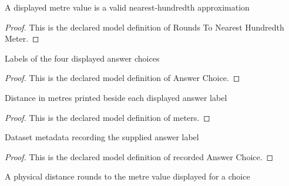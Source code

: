 \begin{definition}
  \label{def:physics:phyx-mini-0780:phyxminiproblems-problemphyxmini0780-roundstonearesthundredthmeter}
  A displayed metre value is a valid nearest-hundredth approximation
\end{definition}
\begin{proof}
  This is the declared model definition of Rounds To Nearest Hundredth Meter.
\end{proof}
\begin{definition}
  \label{def:physics:phyx-mini-0780:phyxminiproblems-problemphyxmini0780-answerchoice}
  Labels of the four displayed answer choices
\end{definition}
\begin{proof}
  This is the declared model definition of Answer Choice.
\end{proof}
\begin{definition}[meters]
  \label{def:physics:phyx-mini-0780:phyxminiproblems-problemphyxmini0780-answerchoice-meters}
  Distance in metres printed beside each displayed answer label
\end{definition}
\begin{proof}
  This is the declared model definition of meters.
\end{proof}
\begin{definition}
  \label{def:physics:phyx-mini-0780:phyxminiproblems-problemphyxmini0780-recordedanswerchoice}
  Dataset metadata recording the supplied answer label
\end{definition}
\begin{proof}
  This is the declared model definition of recorded Answer Choice.
\end{proof}
\begin{definition}
  \label{def:physics:phyx-mini-0780:phyxminiproblems-problemphyxmini0780-matchesdisplayeddistance}
  A physical distance rounds to the metre value displayed for a choice
\end{definition}
